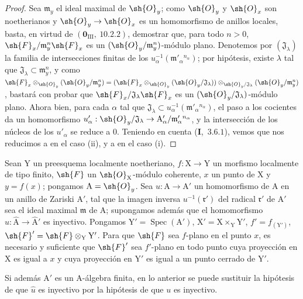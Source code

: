 \begin{proof}
Sea $\mathfrak{m}_y$ el ideal maximal de $\sh{O}_y$; como $\sh{O}_y$ y $\sh{O}_x$ son noetherianos y $\sh{O}_y\to\sh{O}_x$ es un
homomorfismo de anillos locales, basta, en virtud de $(\mathbf{0}_{\mathrm{III}},~10.2.2)$, demostrar que, para
todo $n>0$, $\sh{F}_x/\mathfrak{m}_y^n\sh{F}_x$ es un $(\sh{O}_y/\mathfrak{m}_y^n)$-módulo plano. Denotemos por $(\mathfrak{J}_\lambda)$ la familia de
intersecciones finitas de los $u_\alpha^{-1}(\mathfrak{m}'_\alpha{}^{n_\alpha})$; por hipótesis, existe $\lambda$ tal que
$\mathfrak{J}_\lambda\subset\mathfrak{m}_y^n$, y como
$\sh{F}_x\otimes_{\sh{O}_y}(\sh{O}_y/\mathfrak{m}_y^n)=(\sh{F}_x\otimes_{\sh{O}_y}(\sh{O}_y/\mathfrak{J}_\lambda))\otimes_{\sh{O}_y/\mathfrak{J}_\lambda}(\sh{O}_y/\mathfrak{m}_y^n)$, bastará con probar que $\sh{F}_x/\mathfrak{J}_\lambda\sh{F}_x$ es
un $(\sh{O}_y/\mathfrak{J}_\lambda)$-módulo plano. Ahora bien, para cada $\alpha$ tal que
$\mathfrak{J}_\lambda\subset u_\alpha^{-1}(\mathfrak{m}'_\alpha{}^{n_\alpha})$, el paso a los cocientes da
un homomorfismo $u'_\alpha:\sh{O}_y/\mathfrak{J}_\lambda\to\mathrm{A}'_\alpha/\mathfrak{m}'_\alpha{}^{n_\alpha}$, y la intersección de los núcleos
de los $u'_\alpha$ se reduce a $0$. Teniendo en cuenta (\textbf{I},~$3.6.1$), vemos que nos reducimos a 
en el caso (ii), y a  en el caso (i).
\end{proof}

\begin{corollary}[11.5.2]
\label{IV.11.5.2}
Sean $\mathrm{Y}$ un preesquema localmente noetheriano, $f:\mathrm{X}\to\mathrm{Y}$ un
morfismo localmente de tipo finito, $\sh{F}$ un $\sh{O}_\mathrm{X}$-módulo coherente, $x$ un punto de $\mathrm{X}$ y $y=f(x)$; pongamos
$\mathrm{A}=\sh{O}_y$. Sea $u:\mathrm{A}\to\mathrm{A}'$ un homomorfismo de $\mathrm{A}$ en un anillo de Zariski $\mathrm{A}'$, tal que
la imagen inversa $u^{-1}(\mathfrak{r}')$ del radical $\mathfrak{r}'$ de $\mathrm{A}'$ sea el ideal maximal $\mathfrak{m}$ de $\mathrm{A}$; supongamos además
que el homomorfismo $\hat{u}:\hat{\mathrm{A}}\to\hat{\mathrm{A}}'$ es inyectivo. Pongamos $\mathrm{Y}'=\operatorname{Spec}(\mathrm{A}')$, $\mathrm{X}'=\mathrm{X}\times_\mathrm{Y}\mathrm{Y}'$, $f'=f_{(\mathrm{Y}')}$,
$\sh{F}'=\sh{F}\otimes_\mathrm{Y}\mathrm{Y}'$. Para que $\sh{F}$ sea $f$-plano en el punto $x$, es necesario y suficiente que $\sh{F}'$ sea $f'$-plano en todo
punto cuya proyección en $\mathrm{X}$ es igual a $x$ y cuya proyección en $\mathrm{Y}'$ es igual a un punto cerrado
de $\mathrm{Y}'$.

Si además $\mathrm{A}'$ es un $\mathrm{A}$-álgebra finita, en lo anterior se puede sustituir la hipótesis de que $\hat{u}$
es inyectivo por la hipótesis de que $u$ es inyectivo.
\end{corollary}

